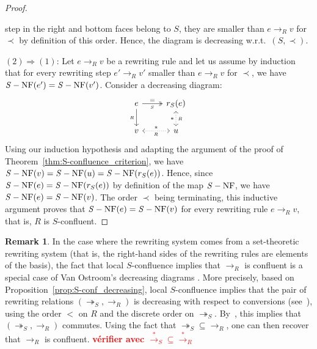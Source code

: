 \documentclass[10pt]{easychair}
\theoremstyle{definition}
\newtheorem{remark}[theorem]{Remark}
\newcommand\todo[1]{{\bf\textcolor{red}{#1}}}
\newcommand\rewR{\to_R}
\newcommand\parS{\twoheadrightarrow_S}
\newcommand\transR{\overset{*}{\to}_R}
\newcommand\transS{\overset{*}{\to}_S}
\DeclareMathOperator{\SNF}{{\it S}-NF}
\begin{document}
\begin{proof}
\begin{itemize}
    step in the right and bottom faces belong to $S$, they are smaller
    than $e\rewR v$ for $\prec$ by definition of this order. Hence, the
    diagram is decreasing w.r.t.\ $(S,\prec)$. 
  \end{itemize}
  $(2)\Rightarrow (1)$: Let $e\rewR v$ be a rewriting rule and let us
  assume by induction that for every rewriting step $e'\rewR v'$ smaller
  than $e\rewR v$ for $\prec$, we have $\SNF(e')=\SNF(v')$. Consider a
  decreasing diagram:
  \[\begin{tikzcd}
  e\ar[d, "_R"']\ar[r, twoheadrightarrow, "=", "_S"'] &
  r_S(e)\ar[d, leftrightarrow, dotted, "*"', "_R"]\\
  v\ar[r, leftrightarrow, dotted, "*", "_R"'] & u
  \end{tikzcd}\]
  Using our induction hypothesis and adapting the argument of the proof
  of Theorem~\ref{thm:S-confluence_criterion}, we have 
  $\SNF(v)=\SNF(u)=\SNF(r_S(e))$. Hence, since $\SNF(e)=\SNF(r_S(e))$ by
  definition of the map $\SNF$, we have $\SNF(e)=\SNF(v)$. The order
  $\prec$ being terminating, this inductive argument proves that
  $\SNF(e)=\SNF(v)$ for every rewriting rule $e\rewR v$, that is, $R$ is
  $S$-confluent.
\end{proof}
\smallskip

\begin{remark}
  In the case where the rewriting system comes from a set-theoretic rewriting
  system (that is, the right-hand sides of the rewriting rules are elements of
  the basis), the fact that local $S$-confluence implies that $\rewR$ is
  confluent is a special case of Van Ostroom's decreasing diagrams
  \cite{van2008confluence}. More precisely, based on
  Proposition~\ref{prop:S-conf_decreasing}, local $S$-confluence implies
  that the pair of rewriting relations $(\parS,\rewR)$ is decreasing with
  respect to conversions (see~\cite[Definition 3]{van2008confluence}),
  using the order $<$ on $R$ and the discrete order on $\parS$.
  By~\cite[Theorem 3]{van2008confluence}, this implies that
  $(\parS,\rewR)$ commutes. Using the fact that $\parS \subseteq \rewR$,
  one can then recover that $\rewR$ is confluent. \todo{vérifier avec
  $\transS\subseteq\transR$}
\end{remark}
\smallskip
\end{document}
